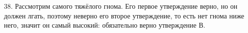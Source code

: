 38. Рассмотрим самого тяжёлого гнома. Его первое утверждение верно, но он должен лгать, поэтому неверно его второе утверждение, то есть нет гнома ниже него, значит он самый высокий: обязательно верно утверждение В.\\
